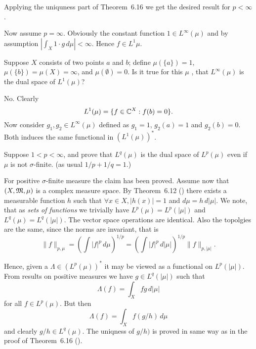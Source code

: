 \begin{enumerate}
Applying the uniquness part of Theorem~6.16 \cite{RudinRCA87}
we get the desired result for \(p<\infty\).

Now assume \(p=\infty\). Obviously the constant function
\(1\in L^\infty(\mu)\) and by assumption
\(|\int_X 1\cdot g\,d\mu|<\infty\). Hence \(f\in L^1{\mu}\).


\begin{excopy}
Suppose $X$ consists of two points $a$ and $b$; define
\(\mu(\{a\}) = 1\),
\(\mu(\{b\}) = \mu(X) = \infty\), and
\(\mu(\emptyset) = 0\).
Is it true for this \(\mu\) ,
that \(L^\infty(\mu)\) is the dual space of \(L^1(\mu)\)?
\end{excopy}

No. Clearly
\begin{equation*}
L^1(\mu) = \{f\in \mathbb{C}^X: f(b)=0\}.
\end{equation*}
Now consider \(g_1,g_2\in L^\infty(\mu)\) defined as
\(g_1=1\), \(g_2(a)=1\) and \(g_2(b)=0\). Both induces the same
functional in \(\left(L^1(\mu)\right)^*\).


\begin{excopy}
Suppose \(1 < p < \infty\), and prove that
\(L^q(\mu)\) is the dual space of \(L^p(\mu)\)
even if \(\mu\) is not \(\sigma\)-finite.
(as usual \(1/p+1/q=1\).)
\end{excopy}

For positive  \(\sigma\)-finite measure the claim has been proved.
Assume now that \((X,\mathfrak{M},\mu)\) is a complex measure space.
By Theorem~6.12 (\cite{RudinRCA87}) there exists a measurable
function $h$ such that \(\forall x\in X, |h(x)|=1\) and
\(d\mu = h\,d|\mu|\).
We note, that as \emph{sets of functions} we trivially have
\(L^p(\mu)=L^p(|\mu|)\) and \(L^q(\mu)=L^q(|\mu|)\).
The vector space operations are identical.
Also the topolgies are the same, since the norms are invariant,
that is
\begin{equation*}
\|f\|_{p,\mu}
= \left(\int |f|^p\,d\mu\right)^{1/p}
= \left(\int |f|^p\,d|\mu|\right)^{1/p}
\|f\|_{p,|\mu|}.
\end{equation*}

Hence, given a \(\Lambda\in (L^p(\mu))^*\)
it may be viewed as a functional on \(L^p(|\mu|)\).
From results on positive measures we have \(g\in L^q(|\mu|)\)
such that
\begin{equation*}
\Lambda(f) = \int_X fg\,d|\mu|
\end{equation*}
for all \(f\in L^p(\mu)\).
But then
\begin{equation*}
\Lambda(f) = \int_X f(g/h)\,d\mu
\end{equation*}
and clearly \(g/h\in L^q(\mu)\).
The uniqness of \(g/h)\) is proved in same way
as in the proof of Theorem~6.16 (\cite{RudinRCA87}).



\end{enumerate}
